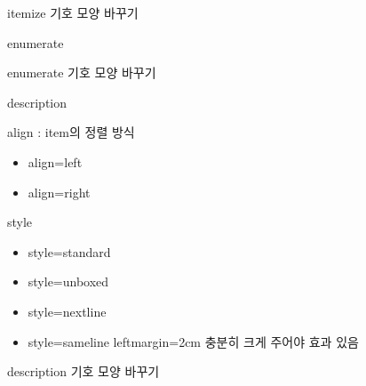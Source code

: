 \documentclass[ aspectratio=149,  10pt,blue,xcolor=pdftex,dvipsnames,table,handout,notes]{beamer}
\begin{document}
		\begin{frame}[t]{itemize 기호 모양 바꾸기}

		\end{frame}


		\begin{frame}[t]{enumerate}

		\end{frame}

		\begin{frame}[t]{enumerate 기호 모양 바꾸기}

		\end{frame}


		\begin{frame}[t]{description}

			\begin{block}{align : item의 정렬 방식}
			\begin{itemize}
			\item align=left
			\item align=right
			\end{itemize}
			\end{block}

			\begin{block}{style}
			\begin{itemize}
			\item style=standard
			\item style=unboxed
			\item style=nextline
			\item style=sameline  leftmargin=2cm 충분히 크게 주어야 효과 있음
			\end{itemize}
			\end{block}



		\end{frame}


		\begin{frame}[t]{description 기호 모양 바꾸기}

		\end{frame}
\end{document}
